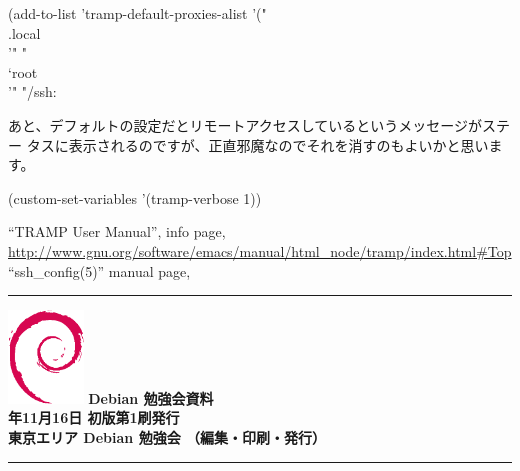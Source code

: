 \documentclass[mingoth,a4paper]{jsarticle}
\newcommand{\debmtgyear}{2013}
\newcommand{\debmtgmonth}{11}
\newcommand{\debmtgdate}{16}
\begin{document}
\begin{commandline}
 (add-to-list 'tramp-default-proxies-alist
      '("\\.local\\'" "\\`root\\'" "/ssh:%
\end{commandline}

あと、デフォルトの設定だとリモートアクセスしているというメッセージがステー
タスに表示されるのですが、正直邪魔なのでそれを消すのもよいかと思います。

\begin{commandline}
(custom-set-variables '(tramp-verbose 1))
\end{commandline}

\begin{thebibliography}{0}
  ``TRAMP User Manual'', info
	 page,
	 \url{http://www.gnu.org/software/emacs/manual/html_node/tramp/index.html#Top}
  ``ssh\_{}config(5)'' manual page,
\end{thebibliography}

\printindex

\cleartooddpage

\vspace*{15cm}
\hrule
\vspace{2mm}
\includegraphics[width=2cm]{image200502/openlogo-nd.eps}
\noindent \Large \bf Debian 勉強会資料\\
\noindent \normalfont \debmtgyear{}年\debmtgmonth{}月\debmtgdate{}日 \hspace{5mm}  初版第1刷発行\\
\noindent \normalfont 東京エリア Debian 勉強会 （編集・印刷・発行）\\
\hrule
\end{document}
